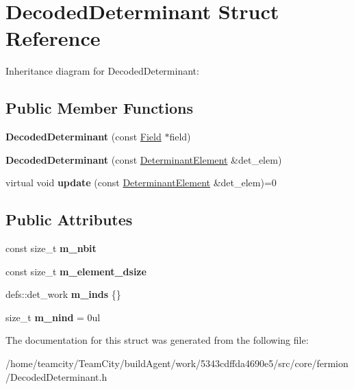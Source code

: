 \hypertarget{structDecodedDeterminant}{}\section{Decoded\+Determinant Struct Reference}
\label{structDecodedDeterminant}


Inheritance diagram for Decoded\+Determinant\+:
\subsection*{Public Member Functions}
\begin{DoxyCompactItemize}
\item 
{\bfseries Decoded\+Determinant} (const \hyperlink{classField}{Field} $\ast$field)\hypertarget{structDecodedDeterminant_a0735455c5d917595573d4710dd8fe61a}{}\label{structDecodedDeterminant_a0735455c5d917595573d4710dd8fe61a}

\item 
{\bfseries Decoded\+Determinant} (const \hyperlink{classDeterminantElement}{Determinant\+Element} \&det\+\_\+elem)\hypertarget{structDecodedDeterminant_a694c656a8d47a8637fff4bd23f3bc543}{}\label{structDecodedDeterminant_a694c656a8d47a8637fff4bd23f3bc543}

\item 
virtual void {\bfseries update} (const \hyperlink{classDeterminantElement}{Determinant\+Element} \&det\+\_\+elem)=0\hypertarget{structDecodedDeterminant_a9d957e501d01a230a41521595377f66d}{}\label{structDecodedDeterminant_a9d957e501d01a230a41521595377f66d}

\end{DoxyCompactItemize}
\subsection*{Public Attributes}
\begin{DoxyCompactItemize}
\item 
const size\+\_\+t {\bfseries m\+\_\+nbit}\hypertarget{structDecodedDeterminant_aa085943321206f6933ea1b39f63538b8}{}\label{structDecodedDeterminant_aa085943321206f6933ea1b39f63538b8}

\item 
const size\+\_\+t {\bfseries m\+\_\+element\+\_\+dsize}\hypertarget{structDecodedDeterminant_a28791ac6bd8b5af4e487bee525200036}{}\label{structDecodedDeterminant_a28791ac6bd8b5af4e487bee525200036}

\item 
defs\+::det\+\_\+work {\bfseries m\+\_\+inds} \{\}\hypertarget{structDecodedDeterminant_a54abd377e297c333dd4bdd6675badee5}{}\label{structDecodedDeterminant_a54abd377e297c333dd4bdd6675badee5}

\item 
size\+\_\+t {\bfseries m\+\_\+nind} = 0ul\hypertarget{structDecodedDeterminant_a002d04b059a903938f644dea5c7d8648}{}\label{structDecodedDeterminant_a002d04b059a903938f644dea5c7d8648}

\end{DoxyCompactItemize}


The documentation for this struct was generated from the following file\+:\begin{DoxyCompactItemize}
\item 
/home/teamcity/\+Team\+City/build\+Agent/work/5343cdffda4690e5/src/core/fermion/Decoded\+Determinant.\+h\end{DoxyCompactItemize}
